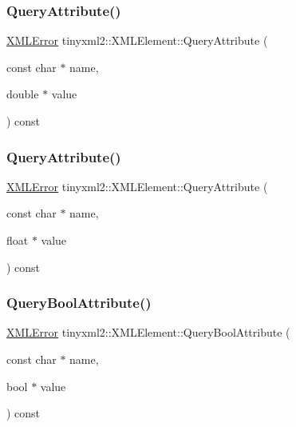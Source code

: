 \subsubsection{\texorpdfstring{Query\+Attribute()}{QueryAttribute()}\hspace{0.1cm}{\footnotesize\ttfamily [5/6]}}
{\footnotesize\ttfamily \mbox{\hyperlink{namespacetinyxml2_a1fbf88509c3ac88c09117b1947414e08}{X\+M\+L\+Error}} tinyxml2\+::\+X\+M\+L\+Element\+::\+Query\+Attribute (\begin{DoxyParamCaption}\item[{const char $\ast$}]{name,  }\item[{double $\ast$}]{value }\end{DoxyParamCaption}) const\hspace{0.3cm}{\ttfamily [inline]}}

\mbox{\label{classtinyxml2_1_1_x_m_l_element_ac85b18ccd9ee8a79a2fd97cc593aae43}} 
\subsubsection{\texorpdfstring{Query\+Attribute()}{QueryAttribute()}\hspace{0.1cm}{\footnotesize\ttfamily [6/6]}}
{\footnotesize\ttfamily \mbox{\hyperlink{namespacetinyxml2_a1fbf88509c3ac88c09117b1947414e08}{X\+M\+L\+Error}} tinyxml2\+::\+X\+M\+L\+Element\+::\+Query\+Attribute (\begin{DoxyParamCaption}\item[{const char $\ast$}]{name,  }\item[{float $\ast$}]{value }\end{DoxyParamCaption}) const\hspace{0.3cm}{\ttfamily [inline]}}

\mbox{\label{classtinyxml2_1_1_x_m_l_element_a14c1bb77c39689838be01838d86ca872}} 
\subsubsection{\texorpdfstring{Query\+Bool\+Attribute()}{QueryBoolAttribute()}}
{\footnotesize\ttfamily \mbox{\hyperlink{namespacetinyxml2_a1fbf88509c3ac88c09117b1947414e08}{X\+M\+L\+Error}} tinyxml2\+::\+X\+M\+L\+Element\+::\+Query\+Bool\+Attribute (\begin{DoxyParamCaption}\item[{const char $\ast$}]{name,  }\item[{bool $\ast$}]{value }\end{DoxyParamCaption}) const\hspace{0.3cm}{\ttfamily [inline]}}



